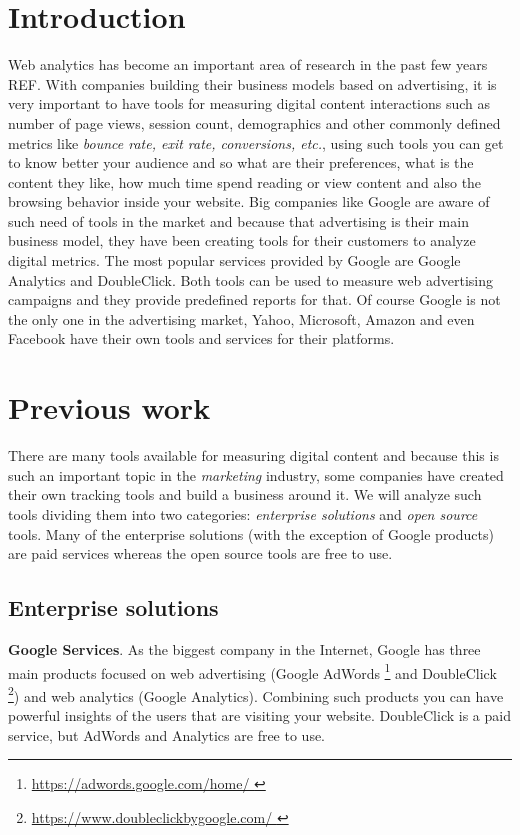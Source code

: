 \documentclass[preprint,12pt,3p]{elsarticle}
\begin{document}
\section{Introduction}
\label{sec:intro}
Web analytics has become an important area of research in the past few years REF. With companies building their business models based on advertising, it is very important to have tools for measuring digital content interactions such as number of page views, session count, demographics and other commonly defined metrics like \textit{bounce rate, exit rate, conversions, etc.}, using such tools you can get to know better your audience and so what are their preferences, what is the content they like, how much time spend reading or view content and also the browsing behavior inside your website.
Big companies like Google are aware of such need of tools in the market and because that advertising is their main business model, they have been creating tools for their customers to analyze digital metrics. The most popular services provided by Google are Google Analytics and DoubleClick. Both tools can be used to measure web advertising campaigns and they provide predefined reports for that. Of course Google is not the only one in the advertising market, Yahoo, Microsoft, Amazon and even Facebook have their own tools and services for their platforms.


\section{Previous work}
\label{sec:background}
There are many tools available for measuring digital content and because this is such an important topic in the \textit{marketing} industry, some companies have created their own tracking tools and build a business around it. We will analyze such tools dividing them into two categories: \textit{enterprise solutions} and \textit{open source} tools. Many of the enterprise solutions (with the exception of Google products) are paid services whereas the open source tools are free to use.


\subsection{Enterprise solutions}

\textbf{Google Services}.
As the biggest company in the Internet, Google has three main products focused on web advertising (Google AdWords \footnote{\url{ https://adwords.google.com/home/ }} and DoubleClick \footnote{\url{ https://www.doubleclickbygoogle.com/ }}) and web analytics (Google Analytics). Combining such products you can have powerful insights of the users that are visiting your website. DoubleClick is a paid service, but AdWords and Analytics are free to use.
\end{document}
